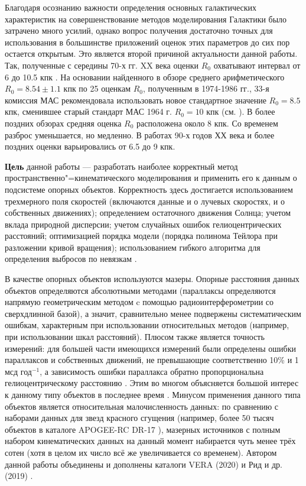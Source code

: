 \documentclass[a4paper, oneside, 14pt]{article}
\begin{document}
Благодаря осознанию важности определения основных галактических характеристик на совершенствование методов моделирования Галактики было затрачено много усилий, однако вопрос получения достаточно точных для использования в большинстве приложений оценок этих параметров до сих пор остается открытым. Это является второй причиной актуальности данной работы. Так, полученные с середины 70-х гг. XX века оценки $ R_0 $ охватывают интервал от 6 до 10.5 кпк \cite{K.L.1986, F.1987, R.1993}. На основании найденного в обзоре \cite{K.L.1986} среднего арифметического $ R_0 = 8.54 \pm 1.1 $ кпк по 25 оценкам $ R_0 $, полученным в 1974-1986 гг., 33-я комиссия МАС рекомендовала использовать новое стандартное значение $ R_0 = 8.5 $ кпк, сменившее старый стандарт МАС 1964 г. $ R_0 = 10 $ кпк (см. \cite{F.T.1991}). В более поздних обзорах \cite{R.1993, N.2004} средняя оценка $ R_0 $ расположена около 8 кпк. Со временем разброс уменьшается, но медленно. В работах 90-х годов ХХ века и более поздних оценки варьировались от 6.5 до 9 кпк.

\textbf{Цель} данной работы --- разработать наиболее корректный метод пространственно"=кинематического моделирования и применить его к данным о подсистеме опорных объектов. Корректность здесь достигается использованием трехмерного поля скоростей (включаются данные и о лучевых скоростях, и о собственных движениях); определением остаточного движения Солнца; учетом вклада природной дисперсии; учетом случайных ошибок гелиоцентрических расстояний; оптимизацией порядка модели (порядка полинома Тейлора при разложении кривой вращения); использованием гибкого алгоритма для определения выбросов по невязкам \cite{N.2012}.

В качестве опорных объектов используются мазеры. Опорные расстояния данных объектов определяются абсолютными методами (параллаксы определяются напрямую геометрическим методом c помощью радиоинтерферометрии со сверхдлинной базой), а значит, сравнительно менее подвержены систематическим ошибкам, характерным при использовании относительных методов (например, при использовании шкал расстояний). Плюсом также является точность измерений: для большей части имеющихся измерений были определены ошибки параллаксов и собственных движений, не превышающие соответственно 10\% и 1 мсд год$^{-1}$, а зависимость ошибки параллакса обратно пропорциональна гелиоцентрическому расстоянию \cite{N.V.2018}. Этим во многом объясняется большой интерес к данному типу объектов в последнее время \cite{R.2009, R.2014, R.2019, B.B.2014, B.B.2015}. Минусом применения данного типа объектов является относительная малочисленность данных: по сравнению с наборами данных для звезд красного сгущения \cite{V.2019} (например, более 50 тысяч объектов в каталоге APOGEE-RC DR-17 \cite{DR17-APOGEE}), мазерных источников с полным набором кинематических данных на данный момент набирается чуть менее трёх сотен (хотя в целом их число всё же увеличивается со временем). Автором данной работы объединены и дополнены каталоги VERA (2020) \cite{VERA.2020} и Рид и др. (2019) \cite{R.2019}.
\end{document}
